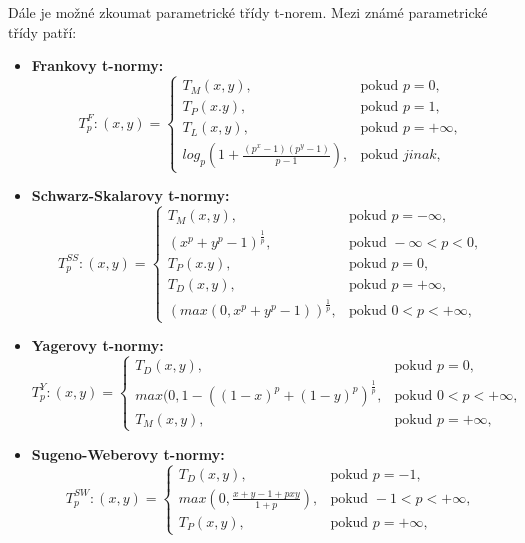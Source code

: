 Dále je možné zkoumat parametrické třídy t-norem. Mezi známé parametrické třídy patří:
\begin{itemize}
    \item \textbf{Frankovy t-normy:}
    $$T_p^F:(x,y)=\begin{cases} T_M(x,y), & \mbox{pokud }  p = 0,\\ 
                                T_P(x.y), & \mbox{pokud } p = 1,\\
                                T_L(x,y), & \mbox{pokud } p = +\infty,\\
                                log_p(1+\frac{(p^x-1)(p^y-1)}{p-1}), & \mbox{pokud } jinak, 
                                \end{cases}$$
    \item \textbf{Schwarz-Skalarovy t-normy:}
    $$T_p^{SS}:(x,y)=\begin{cases} T_M(x,y), & \mbox{pokud }  p = -\infty,\\ 
                                (x^p+y^p-1)^\frac{1}{p}, & \mbox{pokud }  -\infty < p < 0,\\ 
                                T_P(x.y), & \mbox{pokud } p = 0,\\
                                T_D(x,y), & \mbox{pokud } p = +\infty,\\
                                (max(0, x^p+y^p-1))^\frac{1}{p}, & \mbox{pokud } 0 < p < +\infty, \end{cases}$$
    \item \textbf{Yagerovy t-normy:}
    $$T_p^Y:(x,y)=\begin{cases}  T_D(x,y), & \mbox{pokud } p = 0,\\
                                max(0,1-((1-x)^p+(1-y)^p)^\frac{1}{p} , & \mbox{pokud } 0 < p < +\infty,\\
                                T_M(x,y), & \mbox{pokud } p = +\infty,
                                \end{cases}$$
    \item \textbf{Sugeno-Weberovy t-normy:}
    $$T_p^{SW}:(x,y)=\begin{cases}  T_D(x,y), & \mbox{pokud } p = -1,\\
                                    max(0,\frac{x+y-1+pxy}{1+p}) , & \mbox{pokud } -1 < p < +\infty,\\
                                    T_P(x,y), & \mbox{pokud } p = +\infty,
                                    \end{cases}$$
\end{itemize}

